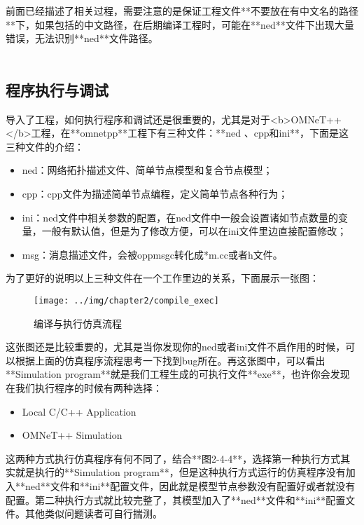 	
前面已经描述了相关过程，需要注意的是保证工程文件**不要放在有中文名的路径**下，如果包括的中文路径，在后期编译工程时，可能在**ned**文件下出现大量错误，无法识别**ned**文件路径。\\ \\

\subsection{程序执行与调试}

导入了工程，如何执行程序和调试还是很重要的，尤其是对于<b>OMNeT++</b>工程，在**omnetpp**工程下有三种文件：**ned 、cpp和ini**，下面是这三种文件的介绍：

\begin{itemize}
	\item ned：网络拓扑描述文件、简单节点模型和复合节点模型；
	\item cpp：cpp文件为描述简单节点编程，定义简单节点各种行为；
	\item ini：ned文件中相关参数的配置，在ned文件中一般会设置诸如节点数量的变量，一般有默认值，但是为了修改方便，可以在ini文件里边直接配置修改；
	\item msg：消息描述文件，会被oppmsgc转化成*m.cc或者h文件。
\end{itemize}


为了更好的说明以上三种文件在一个工作里边的关系，下面展示一张图：

\begin{figure}
	\centering
	\texttt{[image: ../img/chapter2/compile\_exec]}
	\caption{编译与执行仿真流程}\label{fig:1a}
\end{figure}

这张图还是比较重要的，尤其是当你发现你的ned或者ini文件不启作用的时候，可以根据上面的仿真程序流程思考一下找到bug所在。再这张图中，可以看出**Simulation program**就是我们工程生成的可执行文件**exe**，也许你会发现在我们执行程序的时候有两种选择：

\begin{itemize}
	\item Local C/C++ Application
	\item OMNeT++ Simulation
\end{itemize}

这两种方式执行仿真程序有何不同了，结合**图2-4-4**，选择第一种执行方式其实就是执行的**Simulation program**，但是这种执行方式运行的仿真程序没有加入**ned**文件和**ini**配置文件，因此就是模型节点参数没有配置好或者就没有配置。第二种执行方式就比较完整了，其模型加入了**ned**文件和**ini**配置文件。其他类似问题读者可自行揣测。

